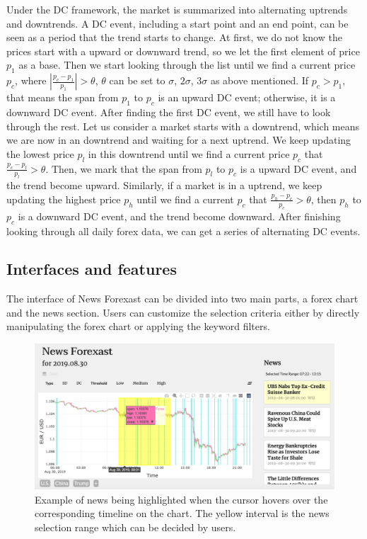\documentclass[sigconf]{acmart}
\begin{document}
Under the DC framework, the market is summarized into alternating uptrends and downtrends\cite{7850020}. A DC event, including a start point and an end point, can be seen as a period that the trend starts to change. At first, we do not know the prices start with a upward or downward trend, so we let the first element of price $p_1$ as a base. Then we start looking through the list until we find a current price $p_c$, where $|\frac{p_c-p_1}{p_1}| > \theta$, $\theta$ can be set to $\sigma$, $2\sigma$, $3\sigma$ as above mentioned. If $p_c > p_1$, that means the span from $p_1$ to $p_c$ is an upward DC event; otherwise, it is a downward DC event. After finding the first DC event, we still have to look through the rest. Let us consider a market starts with a downtrend, which means we are now in an downtrend and waiting for a next uptrend. We keep updating the lowest price $p_l$ in this downtrend until we find a current price $p_c$ that $\frac{p_c-p_l}{p_l} > \theta$. Then, we mark that the span from $p_l$ to $p_c$ is a upward DC event, and the trend become upward. Similarly, if a market is in a uptrend, we keep updating the highest price $p_h$ until we find a current $p_c$ that $\frac{p_h-p_c}{p_c} > \theta$, then $p_h$ to $p_c$ is a downward DC event, and the trend become downward. After finishing looking through all daily forex data, we can get a series of alternating DC events.




\subsection{Interfaces and features}
The interface of News Forexast can be divided into two main parts, a forex chart and the news section. Users can customize the selection criteria either by directly manipulating the forex chart or applying the keyword filters.

\begin{figure}[h]
  \centering
  \includegraphics[width=\linewidth]{hover.png}
  \caption{Example of news being highlighted when the cursor hovers over the corresponding timeline on the chart. The yellow interval is the news selection range which can be decided by users.}
  \Description{}
\end{figure}
\end{document}
